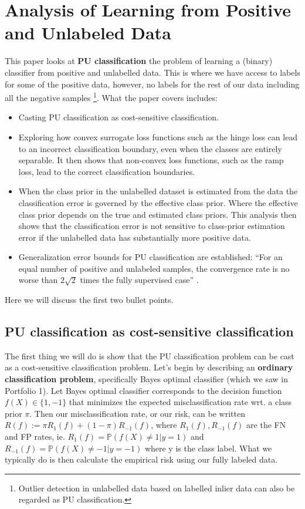 \section{Analysis of Learning from Positive and Unlabeled Data \cite{du2014analysis}}
This paper looks at \textbf{PU classification} the problem of learning a (binary) classifier from positive and unlabelled data. This is where we have access to labels for some of the positive data, however, no labels for the rest of our data including all the negative samples \footnote{Outlier detection in unlabelled data based on labelled inlier data can also be regarded as PU classification.}. What the paper \cite{du2014analysis} covers includes:
\begin{itemize}
    \item Casting PU classification as cost-sensitive classification.
    \item Exploring how convex surrogate loss functions such as the hinge loss can lead to an incorrect classification boundary, even when the classes are entirely separable. It then shows that non-convex loss functions, such as the ramp loss, lead to the correct classification boundaries.  
    \item When the class prior in the unlabelled dataset is estimated from the data the classification error is governed by the effective class prior. Where the effective class prior depends on the true and estimated class priors. This analysis then shows that the classification error is not sensitive to class-prior estimation error if the unlabelled data has substantially more positive data. 
    \item Generalization error bounds for PU classification are established: ``For an equal number of positive and unlabeled samples, the convergence rate is no worse than $2 \sqrt{2}$ times the fully supervised case'' \cite{du2014analysis}.
\end{itemize}
Here we will discuss the first two bullet points.

\subsection*{PU classification as cost-sensitive classification}
The first thing we will do is show that the PU classification problem can be cast as a cost-sensitive classification problem. Let's begin by describing an \textbf{ordinary classification problem}, specifically Bayes optimal classifier (which we saw in Portfolio 1). Let Bayes optimal classifier corresponds to the decision function $f(X) \in \{1,-1\}$ that minimizes the expected misclassification rate wrt. a class prior $\pi$. Then our misclassification rate, or our risk, can be written $R(f) := \pi R_{1}(f) +(1- \pi) R_{-1}(f)$, where $R_{1}(f), R_{-1}(f)$ are the FN and FP rates, ie. $R_{1}(f) = \mathbb{P}(f(X) \neq 1 | y=1)$ and $R_{-1}(f) = \mathbb{P}(f(X) \neq -1 | y=-1)$ where y is the class label. What we typically do is then calculate the empirical risk using our fully labeled data. 

